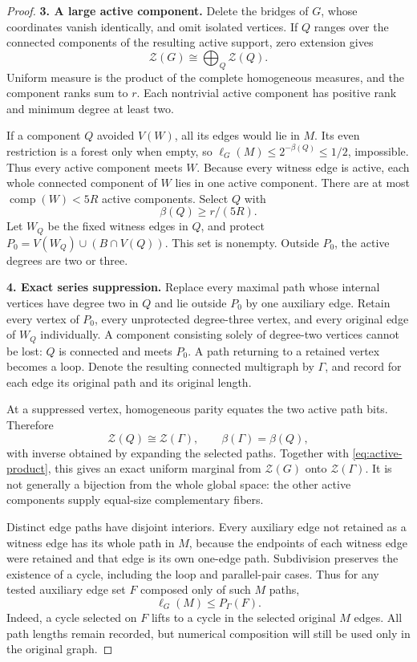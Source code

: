 \documentclass[11pt,a4paper]{article}
\numberwithin{equation}{section}
\theoremstyle{definition}
\theoremstyle{remark}
\newcommand{\cZ}{\mathcal Z}
\newcommand{\cc}{\operatorname{comp}}
\newcommand{\proofstep}[1]{\par\addvspace{\medskipamount}\noindent\textbf{#1}\enspace\ignorespaces}
\begin{document}
\begin{proof}
\proofstep{3. A large active component.}
Delete the bridges of $G$, whose coordinates vanish identically, and omit isolated vertices. If $Q$ ranges over the connected components of the resulting active support, zero extension gives
\begin{equation}\label{eq:active-product}
 \cZ(G)\cong\bigoplus_Q\cZ(Q).
\end{equation}
Uniform measure is the product of the complete homogeneous measures, and the component ranks sum to $r$. Each nontrivial active component has positive rank and minimum degree at least two.

If a component $Q$ avoided $V(W)$, all its edges would lie in $M$. Its even restriction is a forest only when empty, so $\ell_G(M)\le2^{-\beta(Q)}\le1/2$, impossible. Thus every active component meets $W$. Because every witness edge is active, each whole connected component of $W$ lies in one active component. There are at most $\cc(W)<5R$ active components. Select $Q$ with
\begin{equation}\label{eq:owner-rank}
 \beta(Q)\ge r/(5R).
\end{equation}
Let $W_Q$ be the fixed witness edges in $Q$, and protect
$P_0=V(W_Q)\cup(B\cap V(Q))$. This set is nonempty. Outside $P_0$, the active degrees are two or three.

\proofstep{4. Exact series suppression.}
Replace every maximal path whose internal vertices have degree two in $Q$ and lie outside $P_0$ by one auxiliary edge. Retain every vertex of $P_0$, every unprotected degree-three vertex, and every original edge of $W_Q$ individually. A component consisting solely of degree-two vertices cannot be lost: $Q$ is connected and meets $P_0$. A path returning to a retained vertex becomes a loop. Denote the resulting connected multigraph by $\Gamma$, and record for each edge its original path and its original length.

At a suppressed vertex, homogeneous parity equates the two active path bits. Therefore
\begin{equation}\label{eq:series-bijection}
 \cZ(Q)\cong\cZ(\Gamma),\qquad \beta(\Gamma)=\beta(Q),
\end{equation}
with inverse obtained by expanding the selected paths. Together with \eqref{eq:active-product}, this gives an exact uniform marginal from $\cZ(G)$ onto $\cZ(\Gamma)$. It is not generally a bijection from the whole global space: the other active components supply equal-size complementary fibers.

Distinct edge paths have disjoint interiors. Every auxiliary edge not retained as a witness edge has its whole path in $M$, because the endpoints of each witness edge were retained and that edge is its own one-edge path. Subdivision preserves the existence of a cycle, including the loop and parallel-pair cases. Thus for any tested auxiliary edge set $F$ composed only of such $M$ paths,
\begin{equation}\label{eq:lift-domination}
 \ell_G(M)\le P_\Gamma(F).
\end{equation}
Indeed, a cycle selected on $F$ lifts to a cycle in the selected original $M$ edges. All path lengths remain recorded, but numerical composition will still be used only in the original graph.


\end{proof}
\end{document}
